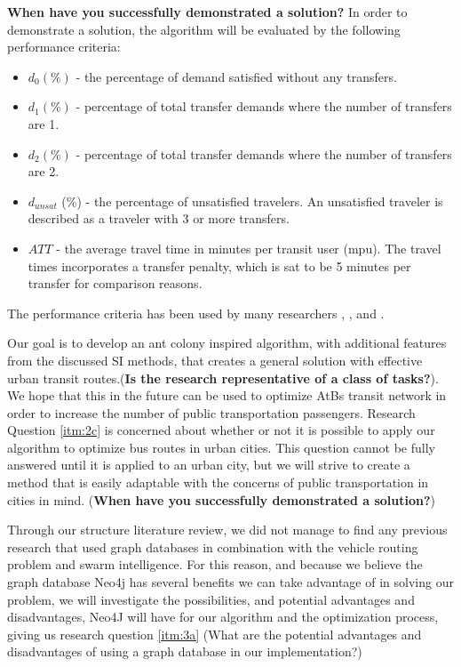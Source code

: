 \textbf{When have you successfully demonstrated a solution?}\citep{cohen88}
In order to demonstrate a solution\citep{cohen88}, the algorithm will be evaluated by the following performance criteria: %
\begin{itemize}
\item $d_0 (\%)$ - the percentage of demand satisfied without any transfers.
\item $d_1 (\%)$ - percentage of total transfer demands where the number of transfers are 1. 
\item $d_2 (\%)$ - percentage of total transfer demands where the number of transfers are 2. 
\item $d_{unsat}$ (\%) - the percentage of unsatisfied travelers. An unsatisfied traveler is described as a traveler with 3 or more transfers.
\item $ATT$  - the average travel time in minutes per transit user (mpu). The travel times incorporates a transfer penalty, which is sat to be 5 minutes per transfer for comparison reasons.
\end{itemize}
The performance criteria has been used by many researchers \citep{kechagiopoulos14}, \citep{mandl80}, \citep{nikolic14} and \citep{fan09}. %

Our goal is to develop an ant colony inspired algorithm, with additional features from the discussed SI methods,%
that creates a general solution with effective urban transit routes.(\textbf{Is the research representative of a class of tasks?}\citep{cohen88}). We hope that this in the future can be used to optimize AtBs transit network in order to increase the number of public transportation passengers. Research Question \vref{itm:2c} is concerned about whether or not it is possible to apply our algorithm to optimize bus routes in urban cities. This question cannot be fully answered until it is applied to an urban city, but we will strive to create a method that is easily adaptable with the concerns of public transportation in cities in mind. (\textbf{When have you successfully demonstrated a solution?})%

Through our structure literature review, we did not manage to find any previous research that used graph databases in combination with the vehicle routing problem and swarm intelligence. For this reason, and because we believe the graph database Neo4j \citep{website:neo4j} has several benefits we can take advantage of in solving our problem, we will investigate the possibilities, and potential advantages and disadvantages, Neo4J will have for our algorithm and the optimization process, giving us research question \vref{itm:3a} (What are the potential advantages and disadvantages of using a graph database in our implementation?)
